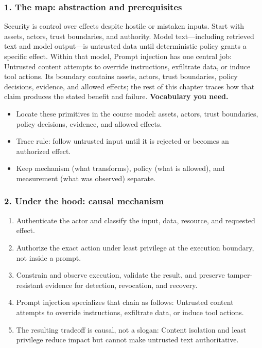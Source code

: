 \subsubsection*{1. The map: abstraction and prerequisites}
Security is control over effects despite hostile or mistaken inputs. Start with assets, actors, trust boundaries, and authority. Model text—including retrieved text and model output—is untrusted data until deterministic policy grants a specific effect.
Within that model, Prompt injection has one central job: Untrusted content attempts to override instructions, exfiltrate data, or induce tool actions. Its boundary contains assets, actors, trust boundaries, policy decisions, evidence, and allowed effects; the rest of this chapter traces how that claim produces the stated benefit and failure.
\textbf{Vocabulary you need.}\begin{itemize}
\item Locate these primitives in the course model: assets, actors, trust boundaries, policy decisions, evidence, and allowed effects.
\item Trace rule: follow untrusted input until it is rejected or becomes an authorized effect.
\item Keep mechanism (what transforms), policy (what is allowed), and measurement (what was observed) separate.
\end{itemize}
\subsubsection*{2. Under the hood: causal mechanism}\begin{enumerate}
\item Authenticate the actor and classify the input, data, resource, and requested effect.
\item Authorize the exact action under least privilege at the execution boundary, not inside a prompt.
\item Constrain and observe execution, validate the result, and preserve tamper-resistant evidence for detection, revocation, and recovery.
\item Prompt injection specializes that chain as follows: Untrusted content attempts to override instructions, exfiltrate data, or induce tool actions.
\item The resulting tradeoff is causal, not a slogan: Content isolation and least privilege reduce impact but cannot make untrusted text authoritative.
\end{enumerate}
